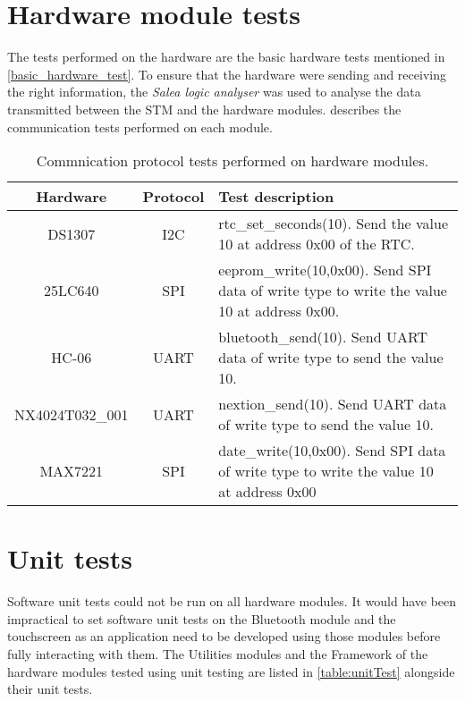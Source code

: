 \section{Hardware module tests}
The tests performed on the hardware are the basic hardware tests mentioned in \ref{basic_hardware_test}.
To ensure that the hardware were sending and receiving the right information, the \textit{Salea logic analyser} was used to analyse the data transmitted between the STM and the hardware modules. describes the communication tests performed on each module.

\begin{table}[h!]
	\centering
	\caption{Commnication protocol tests performed on hardware modules.}
	\label{table:coms_test}
	\begin{tabular}{ccp{25em}}
		\hline
		\hline
		\toprule
		\textbf{Hardware} & \textbf{Protocol} & \textbf{Test description}\\
		\hline
		\hline
		\toprule
		DS1307 & I2C & rtc\_set\_seconds(10). Send the value 10 at address 0x00 of the RTC.\\ 
		\midrule
		25LC640 & SPI & eeprom\_write(10,0x00). Send SPI data of write type to write the value 10 at address 0x00.\\ 
		\midrule
		HC-06 & UART & bluetooth\_send(10). Send UART data of write type to send the value 10.\\ 
		\midrule
		NX4024T032\_001 & UART & nextion\_send(10). Send UART data of write type to send the value 10.\\ 
		\midrule
		MAX7221 & SPI &  date\_write(10,0x00). Send SPI data of write type to write the value 10 at address 0x00\\
		\hline
		\hline
	\end{tabular}
\end{table}



\section{Unit tests}

Software unit tests could not be run on all hardware modules. It would have been impractical to set software unit tests on the Bluetooth module and the touchscreen as an application need to be developed using those modules before fully interacting with them. The Utilities modules and the Framework of the hardware modules tested using unit testing are listed in \cref{table:unitTest} alongside their unit tests.


